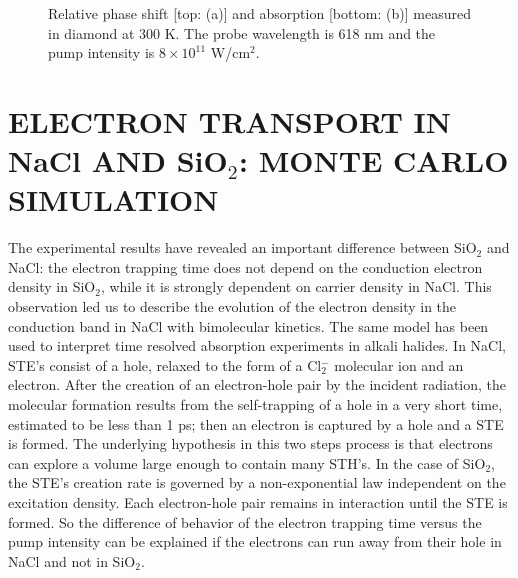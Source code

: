 \documentclass[aps,prb,reprint]{revtex4-2}
\begin{document}
\begin{figure}[ht]
    \centering
    \caption{Relative phase shift [top: (a)] and absorption [bottom: (b)] measured in diamond at 300 K. The probe wavelength is 618 nm and the pump intensity is $8\times10^{11}$ W/cm$^2$.}
    \label{fig:diamond_rel}
\end{figure}

\section{ELECTRON TRANSPORT IN NaCl AND SiO$_2$: MONTE CARLO SIMULATION}

The experimental results have revealed an important difference between SiO$_2$ and NaCl: the electron trapping time does not depend on the conduction electron density in SiO$_2$, while it is strongly dependent on carrier density in NaCl. This observation led us to describe the evolution of the electron density in the conduction band in NaCl with bimolecular kinetics. The same model has been used to interpret time resolved absorption experiments in alkali halides.\cite{21} In NaCl, STE's consist of a hole, relaxed to the form of a Cl$_2^-$ molecular ion and an electron. After the creation of an electron-hole pair by the incident radiation, the molecular formation results from the self-trapping of a hole in a very short time, estimated to be less than 1 ps;\cite{7} then an electron is captured by a hole and a STE is formed. The underlying hypothesis in this two steps process is that electrons can explore a volume large enough to contain many STH's. In the case of SiO$_2$, the STE's creation rate is governed by a non-exponential law independent on the excitation density. Each electron-hole pair remains in interaction until the STE is formed. So the difference of behavior of the electron trapping time versus the pump intensity can be explained if the electrons can run away from their hole in NaCl and not in SiO$_2$.
\end{document}
